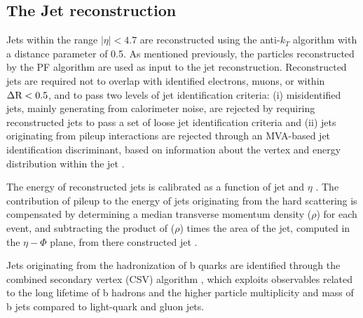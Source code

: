 \subsection {The Jet reconstruction}


Jets within the range \ensuremath{|\eta| < 4.7} are reconstructed using the anti-\ensuremath{k_{T}} algorithm \cite{antikt} with a distance parameter of 0.5. As mentioned previously, the particles reconstructed by the PF algorithm are used as input to the jet reconstruction. Reconstructed jets are required not to overlap with identified electrons, muons, or \hadtau within \ensuremath{\deltar < 0.5}, and to pass two levels of jet identification criteria: (i) misidentified jets, mainly generating from calorimeter noise, are rejected by requiring reconstructed jets to pass a set of loose jet identification criteria \cite{CMS:2010xta} and (ii) jets originating from pileup interactions are rejected through an MVA-based jet identification discriminant, based on information about the vertex and energy distribution within the jet \cite{CMS:2013wea}. 

The energy of reconstructed jets is calibrated as a function of jet \pt and \ensuremath{\eta} \cite{1748-0221-6-11-P11002}. The contribution of pileup to the energy of jets originating from the hard scattering is compensated by determining a median transverse momentum density (\ensuremath{\rho}) for each event, and subtracting the product of (\ensuremath{\rho}) times the area of the jet, computed in the \ensuremath{\eta-\Phi} plane, from there constructed jet \pt \cite{Cacciari:2008gn, Cacciari:2007fd}. 

Jets originating from the hadronization of b quarks are identified through the combined secondary vertex (CSV) algorithm \cite{Chatrchyan:2012jua}, which exploits observables related to the long lifetime of b hadrons and the higher particle multiplicity and mass of b jets compared to light-quark and gluon jets.

	

